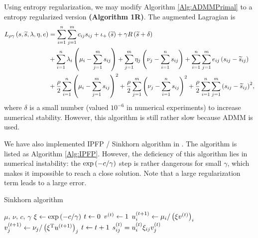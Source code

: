 \documentclass[english]{pkupaper}
\begin{document}
Using entropy regularization, we may modify Algorithm \ref{Alg:ADMMPrimal} to a entropy regularized version \textbf{(Algorithm \hypertarget{EAlg:1R}{1R})}. The augmented Lagragian is
\begin{equation}
\begin{aligned}
L_{ \rho \gamma } \left(  s, \widetilde{s}, \lambda, \eta, e  \right) &= \sum_{ {i} = {1} }^{n}{\sum_{ {j} = {1} }^{m}{ c_{ i j } s_{ i j } }} + \iota_+ \left( \widetilde{s} \right) + \gamma R \left(  \widetilde{s} + \delta  \right) \\
&+ \sum_{ {i} = {1} }^{n}{ \lambda_i \left(  \mu_i - \sum_{ {j} = {1} }^{m}{s_{ i j }}  \right) } + \sum_{ {j} = {1} }^{m}{ \eta_j \left(  \nu_j - \sum_{ {i} = {1} }^{n}{s_{ i j }}  \right) } + \sum_{ {i} = {1} }^{n}{\sum_{ {j} = {1} }^{m}{ e_{ i j } \left(  s_{ i j } - \widetilde{s}_{ i j }  \right) }} \\
&+ \frac{\rho}{2} \sum_{ {i} = {1} }^{n}{\left(  \mu_i - \sum_{ {j} = {1} }^{m}{s_{ i j }}  \right)^2} + \frac{\rho}{2} \sum_{ {j} = {1} }^{m}{\left(  \nu_j - \sum_{ {i} = {1} }^{n}{s_{ i j }}  \right)^2} + \frac{\rho}{2} \sum_{ {i} = {1} }^{n}{\sum_{ {j} = {1} }^{m}{\left(  s_{ i j } - \widetilde{s}_{ i j }  \right)^2}}, \\
\end{aligned}
\end{equation}
where $\delta$ is a small number (valued $10^{-6}$ in numerical experiments) to increase numerical stability. However, this algorithm is still rather slow because ADMM is used.

We have also implemented IPFP / Sinkhorn algorithm in \parencite{Benamou2015}. The algorithm is listed as Algorithm \ref{Alg:IPFP}. However, the deficiency of this algorithm lies in numerical instability: the $ \exp \left(  -c / \gamma  \right) $ step is rather dangerous for small $\gamma$, which makes it impossible to reach a close solution. Note that a large regularization term leads to a large error.

\begin{algorithm}
\caption{Sinkhorn algorithm}
\label{Alg:IPFP}
\begin{algorithmic}
\REQUIRE $\mu$, $\nu$, $c$, $\gamma$
\STATE $ \xi \leftarrow \exp \left(  -c / \gamma  \right) $
\STATE $ t \leftarrow 0 $
\STATE $ v^{\left( t \right)} \leftarrow 1 $
\STATE $ u^{\left(  t + 1  \right)}_i \leftarrow \mu_i / \left(  \xi v^{\left( t \right)}  \right)_i $
\STATE $ v^{\left(  t + 1  \right)}_j \leftarrow \nu_j / \left(  \xi^{\mathrm{T}} u^{\left(  t + 1  \right)}  \right)_j $
\STATE $ t \leftarrow t + 1 $
\ENDWHILE
$s^{\left( t \right)}_{ i j } = u^{\left( t \right)}_i \xi_{ i j } v^{\left( t \right)}_j $
\end{algorithmic}
\end{algorithm}

	
\end{document}
